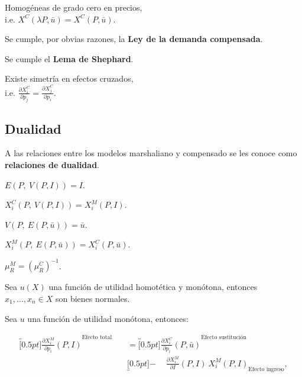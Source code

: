\documentclass[8pt,a4paper]{extarticle}
\begin{document}
\begin{multicols}{3}
	\begin{eqlist}
		\item Homogéneas de grado cero en precios, \\ i.e. $X^C (\lambda P, \bar{u}) = X^C (P, \bar{u})$.
		\item Se cumple, por obvias razones, la \textbf{Ley de la demanda compensada}.
		\item Se cumple el \textbf{Lema de Shephard}.
		\item Existe simetría en efectos cruzados, \\ i.e. $\displaystyle \frac{\partial X_i^C}{\partial p_j} = \frac{\partial X_j^C}{\partial p_i}$.
	\end{eqlist}

	\subsection{Dualidad}

	A las relaciones entre los modelos marshaliano y compensado se les conoce como \textbf{relaciones de dualidad}.

	\begin{eqlist}
		\item $E (P,\ V(P, I))=I$.
		\item $X_i^C (P,\ V(P, I)) = X_i^M (P, I)$.
		\item $V(P,\ E(P, \bar{u})) = \bar{u}$.
		\item $X_i^M (P,\ E(P, \bar{u})) = X_i^C (P, \bar{u})$.
		\item $\mu_R^M = \displaystyle \left(\mu_R^C\right)^{-1}$.
	\end{eqlist}

	\begin{boxprop}
		Sea $u(X)$ una función de utilidad homotética y monótona, entonces $x_1, \ldots, x_n \in X$ son bienes normales.
	\end{boxprop}

	\begin{boxtheo}
		Sea $u$ una función de utilidad monótona, entonces:

		\begin{equation*}
			\begin{aligned}
				\overbracket[0.5pt]{\frac{\partial X^M_i}{\partial p_i} (P, I)}^{\text{Efecto total}} \quad & = \overbracket[0.5pt]{\frac{\partial X^C_i}{\partial p_i} (P, \bar{u})}^{\text{Efecto sustitución}}            \\
				                                                                                            & \underbracket[0.5pt]{ - \quad\ \frac{\partial X_i^M}{\partial I} (P, I)\ X^M_i (P,I)}_{\text{Efecto ingreso}},
			\end{aligned}
		\end{equation*}


\end{boxtheo}
\end{multicols}
\end{document}
